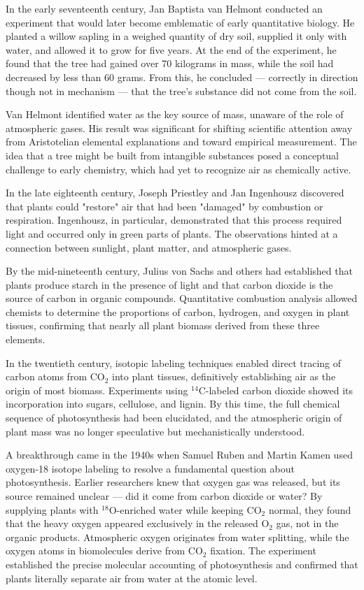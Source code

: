 \begin{historical}
In the early seventeenth century, Jan Baptista van Helmont conducted an experiment that would later become emblematic of early quantitative biology. He planted a willow sapling in a weighed quantity of dry soil, supplied it only with water, and allowed it to grow for five years. At the end of the experiment, he found that the tree had gained over 70 kilograms in mass, while the soil had decreased by less than 60 grams. From this, he concluded — correctly in direction though not in mechanism — that the tree's substance did not come from the soil.

Van Helmont identified water as the key source of mass, unaware of the role of atmospheric gases. His result was significant for shifting scientific attention away from Aristotelian elemental explanations and toward empirical measurement. The idea that a tree might be built from intangible substances posed a conceptual challenge to early chemistry, which had yet to recognize air as chemically active.

In the late eighteenth century, Joseph Priestley and Jan Ingenhousz discovered that plants could "restore" air that had been "damaged" by combustion or respiration. Ingenhousz, in particular, demonstrated that this process required light and occurred only in green parts of plants. The observations hinted at a connection between sunlight, plant matter, and atmospheric gases.

By the mid-nineteenth century, Julius von Sachs and others had established that plants produce starch in the presence of light and that carbon dioxide is the source of carbon in organic compounds. Quantitative combustion analysis allowed chemists to determine the proportions of carbon, hydrogen, and oxygen in plant tissues, confirming that nearly all plant biomass derived from these three elements.

In the twentieth century, isotopic labeling techniques enabled direct tracing of carbon atoms from \(\mathrm{CO}_2\) into plant tissues, definitively establishing air as the origin of most biomass. Experiments using \(^{14}\mathrm{C}\)-labeled carbon dioxide showed its incorporation into sugars, cellulose, and lignin. By this time, the full chemical sequence of photosynthesis had been elucidated, and the atmospheric origin of plant mass was no longer speculative but mechanistically understood.

A breakthrough came in the 1940s when Samuel Ruben and Martin Kamen used oxygen-18 isotope labeling to resolve a fundamental question about photosynthesis. Earlier researchers knew that oxygen gas was released, but its source remained unclear — did it come from carbon dioxide or water? By supplying plants with  \(^{18}\mathrm{O}\)-enriched water while keeping \(\mathrm{CO}_2\) normal, they found that the heavy oxygen appeared exclusively in the released \(\mathrm{O}_2\) gas, not in the organic products. Atmospheric oxygen originates from water splitting, while the oxygen atoms in biomolecules derive from \(\mathrm{CO}_2\) fixation. The experiment established the precise molecular accounting of photosynthesis and confirmed that plants literally separate air from water at the atomic level. 
\end{historical}
